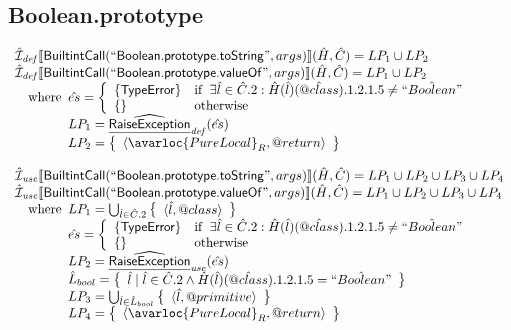 \subsection{Boolean.prototype}
\[
\begin{array}{l}
\aI_{\it def}\lbr \SF{BuiltintCall}(``\SF{Boolean.prototype.toString}",args)\rbr(\hat{H},\hat{C}) = LP_1 \cup LP_2\\
\aI_{\it def}\lbr \SF{BuiltintCall}(``\SF{Boolean.prototype.valueOf}",args)\rbr(\hat{H},\hat{C}) = LP_1 \cup LP_2\\
\quad\wherec{
  \hat{es} = \left\{\begin{array}{ll}
      \{ \SF{TypeError} \}
      & \ifc{\exists\hat{l}\in\hat{C}.2: \hat{H}(\hat{l})(\avarprop{class}).1.2.1.5 \neq \hat{``Boolean"}}\\
      \set{} & \owc
    \end{array}\right.\\
  LP_1 = \ahf{RaiseException}_{\it def}(\hat{es})\\
  LP_2 = \set{\langle\avarloc{PureLocal}_R,\varprop{return}\rangle}\\
  }\\
\\


\aI_{\it use}\lbr \SF{BuiltintCall}(``\SF{Boolean.prototype.toString}",args)\rbr(\hat{H},\hat{C}) = LP_1 \cup LP_2 \cup LP_3 \cup LP_4\\
\aI_{\it use}\lbr \SF{BuiltintCall}(``\SF{Boolean.prototype.valueOf}",args)\rbr(\hat{H},\hat{C}) = LP_1 \cup LP_2 \cup LP_3 \cup LP_4\\
\quad\wherec{
  LP_1 = \bigcup_{\hat{l} \in \hat{C}.2} \set{\langle \hat{l},\varprop{class} \rangle}\\
  \hat{es} = \left\{\begin{array}{ll}
      \{ \SF{TypeError} \}
      & \ifc{\exists\hat{l}\in\hat{C}.2: \hat{H}(\hat{l})(\avarprop{class}).1.2.1.5 \neq \hat{``Boolean"}}\\
      \set{} & \owc
    \end{array}\right.\\
  LP_2 = \ahf{RaiseException}_{\it use}(\hat{es})\\
  \hat{L}_{bool} = \set{\hat{l} \mid \hat{l} \in \hat{C}.2 \land \hat{H}(\hat{l})(\avarprop{class}).1.2.1.5 = \hat{``Boolean"}}\\
  LP_3 = \bigcup_{\hat{l} \in \hat{L}_{bool}} \set{\langle \hat{l},\varprop{primitive} \rangle}\\
  LP_4 = \set{\langle\avarloc{PureLocal}_R,\varprop{return}\rangle}\\
  }\\
\\
\end{array}
\]


